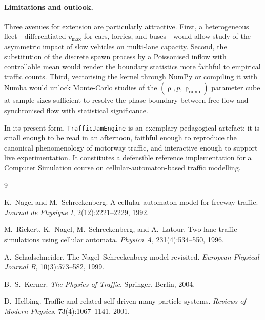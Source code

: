 \documentclass[11pt,a4paper]{article}
\DeclareMathOperator{\dens}{\rho}
\begin{document}
\paragraph{Limitations and outlook.}
Three avenues for extension are particularly attractive. First, a
heterogeneous fleet---differentiated $v_{\max}$ for cars, lorries, and
buses---would allow study of the asymmetric impact of slow vehicles on
multi-lane capacity. Second, the substitution of the discrete spawn
process by a Poissonised inflow with controllable mean would render
the boundary statistics more faithful to empirical traffic counts.
Third, vectorising the kernel through NumPy or compiling it with Numba
would unlock Monte-Carlo studies of the $(\dens,p,\dens_{\text{ramp}})$
parameter cube at sample sizes sufficient to resolve the phase boundary
between free flow and synchronised flow with statistical significance.

In its present form, \texttt{TrafficJamEngine} is an exemplary
pedagogical artefact: it is small enough to be read in an afternoon,
faithful enough to reproduce the canonical phenomenology of motorway
traffic, and interactive enough to support live experimentation. It
constitutes a defensible reference implementation for a Computer
Simulation course on cellular-automaton-based traffic modelling.

\begin{thebibliography}{9}

K.~Nagel and M.~Schreckenberg.
\newblock A cellular automaton model for freeway traffic.
\newblock \emph{Journal de Physique I}, 2(12):2221--2229, 1992.

M.~Rickert, K.~Nagel, M.~Schreckenberg, and A.~Latour.
\newblock Two lane traffic simulations using cellular automata.
\newblock \emph{Physica A}, 231(4):534--550, 1996.

A.~Schadschneider.
\newblock The Nagel--Schreckenberg model revisited.
\newblock \emph{European Physical Journal B}, 10(3):573--582, 1999.

B.~S.~Kerner.
\newblock \emph{The Physics of Traffic}.
\newblock Springer, Berlin, 2004.

D.~Helbing.
\newblock Traffic and related self-driven many-particle systems.
\newblock \emph{Reviews of Modern Physics}, 73(4):1067--1141, 2001.

\end{thebibliography}
\end{document}
